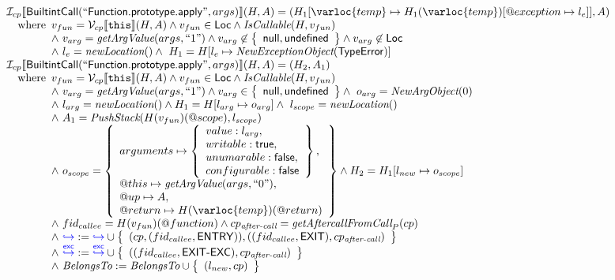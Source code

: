 \[\begin{array}{l}
\I _{cp}\lbr \SF{BuiltintCall}(``\SF{Function.prototype.apply}",args)\rbr(H,A)
 = (H_1[\varloc{temp}\mapsto H_1(\varloc{temp})[\varprop{exception}\mapsto l_e]], A) \\
\quad\wherec{
  v_{fun} = \V _{cp}\lbr \TT{this}\rbr (H,A) \land v_{fun} \in \SF{Loc} \land \hf{IsCallable}(H,v_{fun})\\
  \land\ v_{arg} = \hf{getArgValue}(args, ``1") \land v_{arg} \not\in \set{\SF{null},\SF{undefined}}
  \land v_{arg} \not\in \SF{Loc}\\
  \land\ l_e = \hf{newLocation}() \land\ H_1=H[l_e\mapsto\hf{NewExceptionObject}(\SF{TypeError})] 
  }\\

\I _{cp}\lbr \SF{BuiltintCall}(``\SF{Function.prototype.apply}",args)\rbr(H,A) = (H_2, A_1)\\
\quad\wherec{
  v_{fun} = \V _{cp}\lbr \TT{this}\rbr (H,A) \land v_{fun} \in \SF{Loc} \land \hf{IsCallable}(H,v_{fun})\\
  \land\ v_{arg} = \hf{getArgValue}(args, ``1") \land v_{arg} \in \set{\SF{null},\SF{undefined}}
  \land\ o_{arg} = \hf{NewArgObject}(0)\\
  \land\ l_{arg} = \hf{newLocation}() \land H_1 = H[l_{arg} \mapsto o_{arg}]
  \land\ l_{scope} = \hf{newLocation}()\\
  \land\ A_1=\hf{PushStack}(H(v_{fun})(\varprop{scope}),l_{scope}) \\
  \land\ o_{scope} = \set{
    arguments \mapsto \set{value : l_{arg},\\ 
      writable : \SF{true},\\ unumarable : \SF{false},\\ configurable : \SF{false}},\\
    \varprop{this} \mapsto \hf{getArgValue}(args, ``0"),\\
    \varprop{up} \mapsto A,\\
    \varprop{return} \mapsto H(\varloc{temp})(\varprop{return})}
  \land H_2 = H_1[l_{new} \mapsto o_{scope}]\\
  \land\ fid_{callee}= H(v_{fun})(\varprop{function})
  \land cp_{\textit{after-call}} = \hf{getAftercallFromCall}_P(cp) \\
  \land\ {\inblue \cfgnext} :=
  {\inblue \cfgnext}\cup\set{( cp,(fid_{callee},\SF{ENTRY})),
    ((fid_{callee},\SF{EXIT}), cp_{\textit{after-call}})}\\
  \land\ {\inblue \excnext}:={\inblue \excnext}
  \cup\set{((fid_{callee},\SF{EXIT-EXC}), cp_{\textit{after-call}})}\\
  \land\ \hf{BelongsTo}:=\hf{BelongsTo}\cup\set{(l_{new},cp)}
  }\\


\end{array}\]
